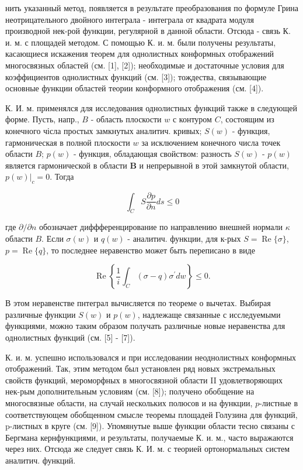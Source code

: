 \documentclass[10pt]{article}
\begin{document}
нить указанный метод, появляется в результате преобразования по формуле Грина неотрицательного двойного интеграла - интеграла от квадрата модуля производной нек-рой функции, регулярной в данной области. Отсюда - связь К. и. м. с площадей методом. С помощью К. и. м. были получены результаты, касающиеся искажения теорем для однолистных конформных отображений многосвязных областей (см. [1], [2]); необходимые и достаточные условия для коэффициентов однолистных функций (см. [3]); тождества, связывающие основные функции областей теории конформного отображения (см. [4]).



К. И. м. применялся для исследования однолистных функций также в следующей форме. Пусть, напр., $B$ - область плоскости $w$ с контуром $C$, состоящим из конечного чісла простых замкнутых аналитич. кривых; $S(w)$ - функция, гармоническая в полной плоскости $w$ за исключением конечного числа точек области $B$; $p(w)$ - функция, обладающая свойством: разность $S(w)$ - $p(w)$ является гармонической в области $\boldsymbol{B}$ и непрерывной в этой замкнутой области, $\left.p(w)\right|_{c}=0$. Тогда



\[

\int_{C} S \frac{\partial p}{\partial n} d s \leqslant 0

\]



где $\partial / \partial n$ обозначает диффференцирование по направлению внешней нормали $\kappa$ области $B$. Если $\sigma(w)$ и $q(w)$ - аналитич. функции, для к-рых $S=\operatorname{Re}\{\sigma\}$, $p=\operatorname{Re}\{q\}$, то последнее неравенство может быть переписано в виде



\[

\operatorname{Re}\left\{\frac{1}{i} \int_{C}(\sigma-q) \sigma^{\prime} d w\right\} \leqslant 0 .

\]



В этом неравенстве пнтеграл вычисляется по теореме о вычетах. Выбирая различные функции $S(w)$ и $p(w)$, надлежаще связанные с исследуемыми функциями, можно таким образом получать различные новые неравенства для однолистных функций (см. [5] - [7]).



К. и. м. успешно использовался и при исследовании неоднолистных конформных отображений. Так, этим методом был установлен ряд новых экстремальных свойств функций, мероморфных в многосвязной области II удовлетворяющих нек-рым дополнительным условиям (см. [8]); получено обобщение на многосвязные области, на случай нескольких полюсов и на функции, $p$-листные в соответствующем обобщенном смысле теоремы площадей Голузина для функций, p-листных в круге (см. [9]). Упомянутые выше функции области тесно связаны с Бергмана кернфункциями, и результаты, получаемые К. и. м., часто выражаются через них. Отсюда же следует связь К. И. м. с теорией ортонормальных систем аналитич. функций.
\end{document}
